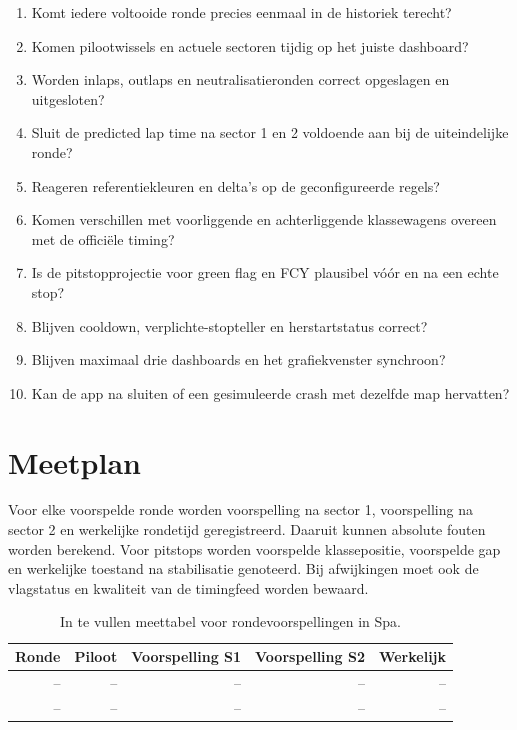 \begin{enumerate}
  \item Komt iedere voltooide ronde precies eenmaal in de historiek terecht?
  \item Komen pilootwissels en actuele sectoren tijdig op het juiste dashboard?
  \item Worden inlaps, outlaps en neutralisatieronden correct opgeslagen en uitgesloten?
  \item Sluit de predicted lap time na sector 1 en 2 voldoende aan bij de uiteindelijke ronde?
  \item Reageren referentiekleuren en delta's op de geconfigureerde regels?
  \item Komen verschillen met voorliggende en achterliggende klassewagens overeen met de officiële timing?
  \item Is de pitstopprojectie voor green flag en FCY plausibel vóór en na een echte stop?
  \item Blijven cooldown, verplichte-stopteller en herstartstatus correct?
  \item Blijven maximaal drie dashboards en het grafiekvenster synchroon?
  \item Kan de app na sluiten of een gesimuleerde crash met dezelfde map hervatten?
\end{enumerate}

\section{Meetplan}
Voor elke voorspelde ronde worden voorspelling na sector 1, voorspelling na sector 2 en werkelijke rondetijd geregistreerd. Daaruit kunnen absolute fouten worden berekend. Voor pitstops worden voorspelde klassepositie, voorspelde gap en werkelijke toestand na stabilisatie genoteerd. Bij afwijkingen moet ook de vlagstatus en kwaliteit van de timingfeed worden bewaard.

\begin{table}[ht]
\centering
\caption{In te vullen meettabel voor rondevoorspellingen in Spa.}
\begin{tabular}{rrrrr}
\toprule
Ronde & Piloot & Voorspelling S1 & Voorspelling S2 & Werkelijk \\
\midrule
-- & -- & -- & -- & -- \\
-- & -- & -- & -- & -- \\
\bottomrule
\end{tabular}
\end{table}

